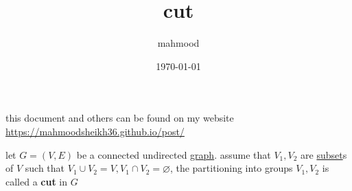 \documentclass[a4paper,12pt]{article}
\author{mahmood}
\date{\today}
\title{cut}
\begin{document}
\maketitle
\begin{note}
this document and others can be found on my website\\
\url{https://mahmoodsheikh36.github.io/post/}
\end{note}
let \(G=(V,E)\) be a connected undirected \href{20230314001051-graph.org}{graph}. assume that \(V_1,V_2\) are \href{discrete_maths2.org}{subset}s of \(V\) such that \(V_1 \cup V_2 = V,V_1 \cap V_2 = \varnothing\), the partitioning into groups \(V_1,V_2\) is called a \textbf{cut} in \(G\)
\end{document}
